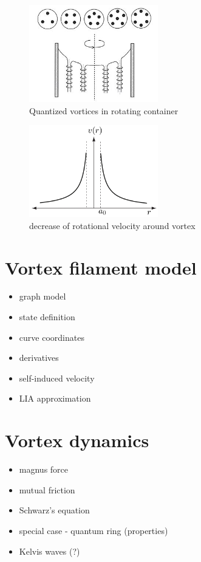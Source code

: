 \begin{figure}[h]
	\centering
	\includegraphics[width=0.5\textwidth]{graphics/theory/rotating-helium}
	\caption{Quantized vortices in rotating container}
	\label{rotating-helium}
\end{figure}

\begin{figure}[h]
	\centering
	\includegraphics[width=0.5\textwidth]{graphics/theory/vortex_velocity}
	\caption{decrease of rotational velocity around vortex}
	\label{vortex_velocity}
\end{figure}


\section{Vortex filament model}
\begin{itemize}
	\item graph model
	\item state definition
	\item curve coordinates
	\item derivatives
	\item self-induced velocity
	\item LIA approximation
\end{itemize}

\section{Vortex dynamics}
\begin{itemize}
	\item magnus force
	\item mutual friction
	\item Schwarz's equation
	\item special case - quantum ring (properties)
	\item Kelvis waves (?)
\end{itemize}

